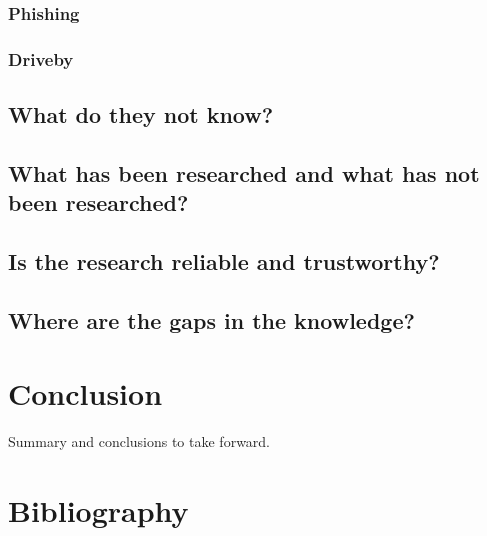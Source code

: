 \documentclass[a4paper, 11pt]{article}
\begin{document}
\subsubsection{Phishing}
\label{sec:phishing}

\subsubsection{Driveby}
\label{sec:driveby}

\subsection{What do they not know?}


\subsection{What has been researched and what has not been researched?}


\subsection{Is the research reliable and trustworthy?}


\subsection{Where are the gaps in the knowledge?}

\section{Conclusion}
Summary and conclusions to take forward.

\section{Bibliography}


\end{document}
